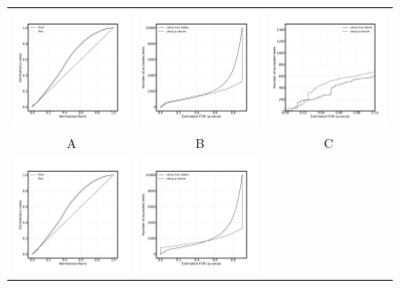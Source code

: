 \documentclass{article}
\begin{document}
\begin{figure}
    \centering
        \begin{tabular}{ccc}
 		\includegraphics[width=2in]{img/QQ_shift_binary_with.png} &
		\includegraphics[width=2in]{img/shift_test_pred_with_labels.png} & 
            \includegraphics[width=2in]
            {img/shift_test_pred_with_labels_loc.png}
		\\	
		A & B & C\\
            \includegraphics[width=2in]{img/QQ_shift_binary_no.png} &
		\includegraphics[width=2in]{img/shift_test_pred_no_labels.png} &  

\end{tabular}
\end{figure}
\end{document}
